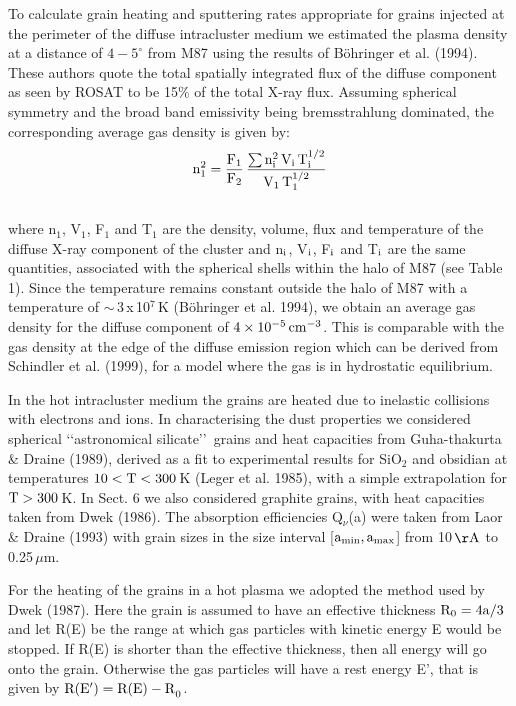 \documentclass[]{aa}
\begin{document}
To calculate grain heating and sputtering rates appropriate for grains
injected at the perimeter of the diffuse intracluster medium
we estimated the plasma density at a distance of $4-5^{\circ}$ from M87
using the results of B\"ohringer et al. (1994). These authors quote
the total spatially integrated flux of the diffuse component as seen by
ROSAT to be 15$\%$ of the total X-ray flux. 
Assuming spherical symmetry and the broad band emissivity being 
bremsstrahlung dominated, the corresponding average gas density 
is given by:
\begin{eqnarray}
{\rm n}_1^2 = \frac{{\rm F}_1}{{\rm F}_2}\,\frac{\sum{\rm n}_{\rm i}^2\,
{\rm V}_{\rm i}\,{\rm T}_{\rm i}^{1/2}}{{\rm V}_1\,{\rm T}_1^{1/2}} 
\end{eqnarray}
\\
where n$_{1}$, V$_{1}$, F$_{1}$ and T$_{1}$ are the density, volume, flux and 
temperature of the diffuse X-ray component of the cluster and n$_{\rm i}$, 
V$_{\rm i}$, F$_{\rm i}$ and T$_{\rm i}$ are
the same quantities, associated with the spherical shells within the halo of 
M87 (see Table 1). Since 
the temperature remains constant outside the halo of M87 with a 
temperature of $\sim\,$3$\,$x$\,$10$^{7}\,$K (B\"ohringer et al. 
1994), we obtain an average gas density for the diffuse component of 
$4\times 10^{-5}\,{\rm cm}^{-3}$. This is comparable with the gas density
at the edge of the diffuse emission region
which can be derived from Schindler et al. (1999), for a model where the 
gas is in hydrostatic equilibrium.  

In the hot intracluster medium the grains are heated due to inelastic
collisions with electrons and ions. In characterising the dust properties we 
considered spherical 
\lq\lq astronomical silicate\rq\rq\, grains and heat
capacities from Guha-thakurta \& Draine (1989), derived as a 
fit to experimental results for SiO$_2$ and obsidian at temperatures $10< 
{\rm T} < 300$\,K (Leger et al. 1985), with a simple extrapolation 
for ${\rm T}>300$\,K. In Sect. 6 we also considered graphite grains, with 
heat capacities taken from Dwek (1986). The absorption efficiencies 
Q$_{\nu}$(a) were taken from
Laor \& Draine (1993) with grain sizes in the size interval 
[${\rm a}_{\rm min},{\rm a}_{\rm max}$] from 10\,${\rm \AA}$ to 
0.25\,${\mu}$m.  

For the heating of the grains in a hot plasma we adopted the method used
by Dwek (1987). Here the grain is assumed to have an effective thickness 
${\rm R}_0=4{\rm a}/3$ and let R(E) be the range at which gas particles with 
kinetic energy E would be stopped. If R(E) is shorter than  the effective 
thickness, then all energy will go onto the grain. Otherwise the gas 
particles will have a rest energy E', that is given by ${\rm R(E')=R(E)-R}_0$. 
\end{document}

